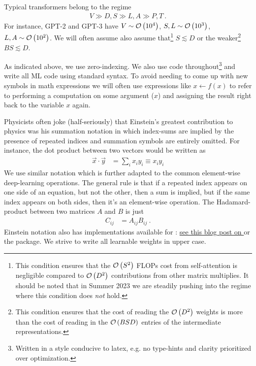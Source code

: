     Typical
transformers belong to the regime
\begin{gather}
	V \gg D, S \gg L, A \gg P, T \ .  \label{app_eq_transformers_approxs}
\end{gather}
For instance, GPT-2 and GPT-3 \cite{gpt2radford2019language, gpt3brown2020language} have $ V \sim
	\mathcal{O} \left( 10 ^{ 4 } \right)  $, $ S, L \sim \mathcal{O} \left( 10 ^{ 3 } \right)  $, $ L, A \sim \mathcal{O}
	\left( 10 ^{ 2 } \right)  $. We will often assume also assume that\footnote{This condition ensures
	that the $ \mathcal{O} \left( S ^{ 2 } \right)  $ FLOPs cost from self-attention is negligible
	compared to $ \mathcal{O} \left( D ^{ 2 } \right)  $ contributions from other matrix multiplies.  It
	should be noted that in Summer 2023 we are steadily pushing into the regime where this condition
	does \textit{not}  hold.} $ S \lesssim D $ or the weaker\footnote{This condition ensures that the
	cost of reading the $ \mathcal{O} \left( D ^{ 2 } \right)  $ weights is more than the cost of reading in
	the $ \mathcal{O} \left( BSD \right)  $ entries of the intermediate representations.} $ BS \lesssim D $.

As indicated above,  we use zero-indexing. We also use  code
throughout\footnote{Written in a style conducive to latex, e.g. no type-hints and clarity
prioritized over optimization.}  and write all ML code using standard  syntax. To
avoid needing to come up with new symbols in math expressions we will often use expressions like $ x
\leftarrow f(x) $ to refer to performing a computation on some argument ($ x $) and assigning the
result right back to the variable $ x $ again.

Physicists often joke (half-seriously) that Einstein's greatest contribution to physics was his
summation notation in which index-sums are implied by the presence of repeated indices and summation
symbols are entirely omitted. For instance, the dot product between two vectors would be written as
\begin{align}
	\vec{x} \cdot \vec{y} & = \sum _{ i } x _{ i } y _{ i } \equiv x _{ i } y _{  i }
	\label{app_eq_einstein_sum}
\end{align}
We use similar notation which is further adapted to the common element-wise deep-learning
operations.  The general rule is that if a repeated index appears on one side of an equation, but
not the other, then a sum is implied, but if the same index appears on both sides, then it's an
element-wise operation. The Hadamard-product between two matrices $ A $ and $ B $ is just
\begin{align}
	C _{ ij } & = A _{ ij } B _{ ij }\ .
\end{align}
Einstein notation also has implementations available for :
\href{https://rockt.github.io/2018/04/30/einsum}{see this blog post on } or the
\href{https://einops.rocks/1-einops-basics/}{} package.  We strive to write all
learnable weights in upper case.

